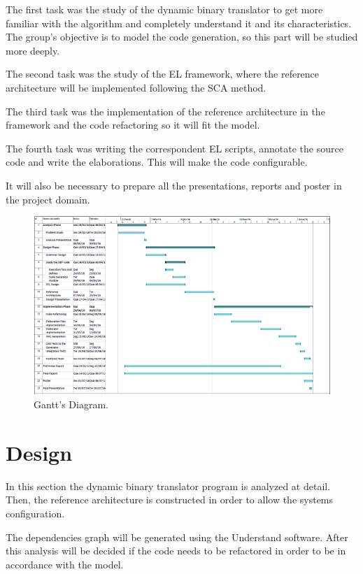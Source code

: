\documentclass[11pt]{report}
\begin{document}
	\par The first task was the study of the dynamic binary translator to get more familiar with the algorithm and completely understand it and its characteristics. The group's objective is to model the code generation, so this part will be studied more deeply.
	\par The second task was the study of the EL framework, where the reference architecture will be implemented following the SCA method.
	\par The third task was the implementation of the reference architecture in the framework and the code refactoring so it will fit the model. 
	\par The fourth task was writing the correspondent EL scripts, annotate the source code and write the elaborations. This will make the code configurable.
	\par It will also be necessary to prepare all the presentations, reports and poster in the project domain.
	
	\begin{figure} [H]
		\centering
		\includegraphics[width=1\linewidth]{Images/gantv2}
		\caption{Gantt's Diagram.}
		\label{fig:gantt}
	\end{figure}
	



\chapter{Design}

	\par In this section the dynamic binary translator program is analyzed at detail. Then, the reference architecture is constructed in order to allow the systems configuration. 
	\par The dependencies graph will be generated using the Understand software. After this analysis will be decided if the code needs to be refactored in order to be in accordance with the model. 
	
\end{document}
